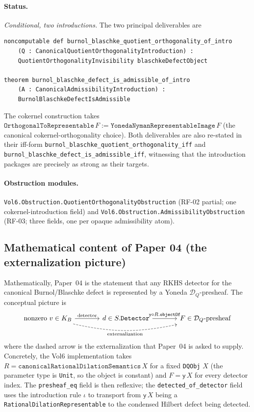 \documentclass[11pt]{article}
\theoremstyle{plain}
\theoremstyle{definition}
\theoremstyle{remark}
\newcommand{\DQ}{\mathcal{D}_{Q}}
\newcommand{\Yon}{\mathsf{y}}
\newcommand{\code}[1]{\texttt{#1}}
\begin{document}
\paragraph{Status.}
\emph{Conditional, two introductions.} The two principal
deliverables are
\begin{lstlisting}
noncomputable def burnol_blaschke_quotient_orthogonality_of_intro
    (Q : CanonicalQuotientOrthogonalityIntroduction) :
    QuotientOrthogonalityInvisibility blaschkeDefectObject

theorem burnol_blaschke_defect_is_admissible_of_intro
    (A : CanonicalAdmissibilityIntroduction) :
    BurnolBlaschkeDefectIsAdmissible
\end{lstlisting}
The cokernel construction takes
\(\code{OrthogonalToRepresentable}\,F :=
   \code{YonedaNymanRepresentableImage}\,F\) (the canonical
cokernel-orthogonality choice). Both
deliverables are also re-stated in their iff-form
\code{burnol\_blaschke\_quotient\_orthogonality\_iff} and
\code{burnol\_blaschke\_defect\_is\_admissible\_iff}, witnessing
that the introduction packages are precisely as
strong as their targets.

\paragraph{Obstruction modules.}
\code{Vol6.Obstruction.QuotientOrthogonalityObstruction} (RF-02
partial; one cokernel-introduction field) and
\code{Vol6.Obstruction.AdmissibilityObstruction} (RF-03; three
fields, one per opaque admissibility atom).

\subsection{Mathematical content of Paper 04 (the externalization picture)}

Mathematically, Paper~04 is the statement that any RKHS detector for
the canonical Burnol/Blaschke defect is represented by a Yoneda
\(\DQ\)-presheaf.  The conceptual picture is
\[
  \begin{tikzcd}[column sep=large]
    \text{nonzero }v \in K_{B}
      \arrow[r, "{\,\text{detector}\,}"]
      \arrow[rr, bend right=12, "{\,\text{externalization}\,}"', dashed]
    & d \in S.\code{Detector}
      \arrow[r, "{\,\Yon \circ R.\code{objectOf}\,}"]
    & F \in \DQ\text{-presheaf}
  \end{tikzcd}
\]
where the dashed arrow is the externalization that Paper~04 is
asked to supply.  Concretely, the Vol6 implementation takes
\(R = \code{canonicalRationalDilationSemantics}\,X\) for a fixed
\code{DQObj} \(X\) (the parameter type is \code{Unit}, so the object
is constant) and \(F = \Yon\,X\) for every detector index.  The
\code{presheaf\_eq} field is then reflexive; the \code{detected\_of\_detector}
field uses the introduction rule \(\iota\) to transport from
\(\Yon\,X\) being a \code{RationalDilationRepresentable} to the
condensed Hilbert defect being detected.
\end{document}
